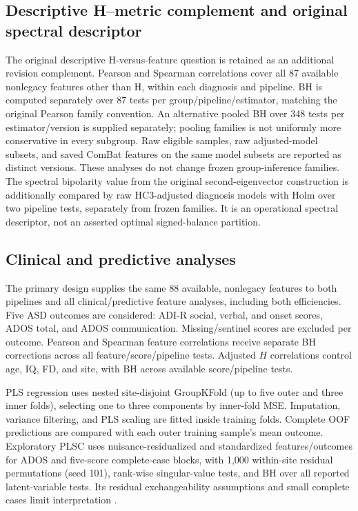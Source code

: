 \documentclass[10pt,letterpaper]{article}
\begin{document}
\subsection*{Descriptive H--metric complement and original spectral descriptor}
The original descriptive H-versus-feature question is retained as an additional
revision complement. Pearson and Spearman correlations cover all 87 available
nonlegacy features other than H, within each diagnosis and pipeline. BH is
computed separately over 87 tests per group/pipeline/estimator, matching the
original Pearson family convention. An alternative pooled BH over 348 tests per
estimator/version is supplied separately; pooling families is not uniformly more
conservative in every subgroup. Raw eligible samples, raw adjusted-model subsets,
and saved ComBat features on the same model subsets are reported as distinct
versions. These analyses do not change frozen group-inference families.
The spectral bipolarity value from the original second-eigenvector construction
is additionally compared by raw HC3-adjusted diagnosis models with Holm over
two pipeline tests, separately from frozen families. It is an operational
spectral descriptor, not an asserted optimal signed-balance partition.

\subsection*{Clinical and predictive analyses}
The primary design supplies the same 88 available, nonlegacy features to both
pipelines and all clinical/predictive feature analyses, including both efficiencies.
Five ASD outcomes are considered: ADI-R social, verbal, and onset scores, ADOS
total, and ADOS communication. Missing/sentinel scores are excluded per outcome.
Pearson and Spearman feature correlations receive separate BH corrections across
all feature/score/pipeline tests. Adjusted $H$ correlations control age, IQ, FD,
and site, with BH across available score/pipeline tests.

PLS regression uses nested site-disjoint GroupKFold (up to five outer and three
inner folds), selecting one to three components by inner-fold MSE. Imputation,
variance filtering, and PLS scaling are fitted inside training folds. Complete
OOF predictions are compared with each outer training sample's mean outcome.
Exploratory PLSC uses nuisance-residualized and standardized features/outcomes for
ADOS and five-score complete-case blocks, with 1,000 within-site residual
permutations (seed 101), rank-wise singular-value tests, and BH over all reported
latent-variable tests. Its residual exchangeability assumptions and small complete
cases limit interpretation \cite{Krishnan2011}.
\end{document}
